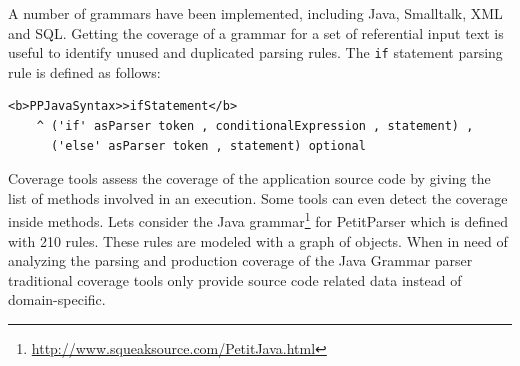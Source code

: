\documentclass[runningheads]{llncs}
\newcommand{\ct}{\lstinline[backgroundcolor=\color{white},basicstyle=\footnotesize\ttfamily]}
\newcommand{\lr}[1]{\nb{Lukas}{orange}{#1}}
\begin{document}
A number of grammars have been implemented, including Java, Smalltalk, XML and SQL. 
Getting the coverage of a grammar for a set of referential input text is useful to identify unused and duplicated parsing rules. The \ct{if} statement parsing rule is defined as follows:

\begin{lstlisting}
<b>PPJavaSyntax>>ifStatement</b>
    ^ ('if' asParser token , conditionalExpression , statement) , 
	  ('else' asParser token , statement) optional
\end{lstlisting}


Coverage tools assess the coverage of the application source code by giving the list of methods involved in an execution. Some tools can even detect the coverage inside methods.
Lets consider the Java grammar\footnote{\url{http://www.squeaksource.com/PetitJava.html}} for PetitParser which is defined with 210 rules. These rules are modeled with a graph of objects. 
When in need of analyzing the parsing and production coverage of the Java Grammar parser traditional coverage tools only provide source code related data instead of domain-specific.
\end{document}
